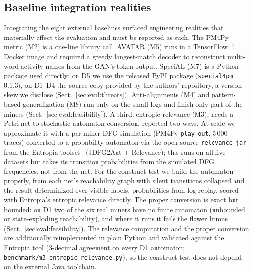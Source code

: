 \documentclass[runningheads]{llncs}
\newcommand{\chg}[1]{\textcolor{chgblue}{#1}}
\begin{document}
\subsection{Baseline integration realities}
\label{sec:impl:baselines}
Integrating the eight external baselines surfaced engineering realities that materially affect the evaluation and must be reported as such. The PM4Py metric (M2) is a one-line library call. AVATAR (M5) runs in a TensorFlow~1 Docker image and required a greedy longest-match decoder to reconstruct multi-word activity names from the GAN's token output. SpeciAL (M7) is a Python package used directly\chg{; on D5 we use the released PyPI package (\texttt{special4pm} 0.1.3), on D1--D4 the source copy provided by the authors' repository, a version skew we disclose (Sect.~\ref{sec:eval:threats})}. \chg{Anti-alignments (M4) and pattern-based generalization (M8) run only on the small logs and finish only part of the miners} (Sect.~\ref{sec:eval:feasibility}). A third, entropic relevance (M3), needs a Petri-net-to-stochastic-automaton conversion, reported two ways. \chg{At scale we approximate it with a per-miner DFG simulation (PM4Py \texttt{play\_out}, 5\,000 traces) converted to a probability automaton via the open-source \texttt{relevance.jar} from the Entropia toolset~\cite{polyvyanyy2020entropia} (JDFG2Aut + Relevance); this runs on all five datasets but takes its transition probabilities from the simulated DFG frequencies, not from the net. For the construct test we build the automaton properly, from each net's reachability graph with silent transitions collapsed and the result determinized over visible labels, probabilities from log replay, scored with Entropia's entropic relevance directly. The proper conversion is exact but bounded: on D1 two of the six real miners have no finite automaton (unbounded or state-exploding reachability), and where it runs it fails the flower litmus (Sect.~\ref{sec:eval:feasibility}). The relevance computation and the proper conversion are additionally reimplemented in plain Python and validated against the Entropia tool ($3$-decimal agreement on every D1 automaton; \texttt{benchmark/m3\_entropic\_relevance.py}), so the construct test does not depend on the external Java toolchain.}
\end{document}
